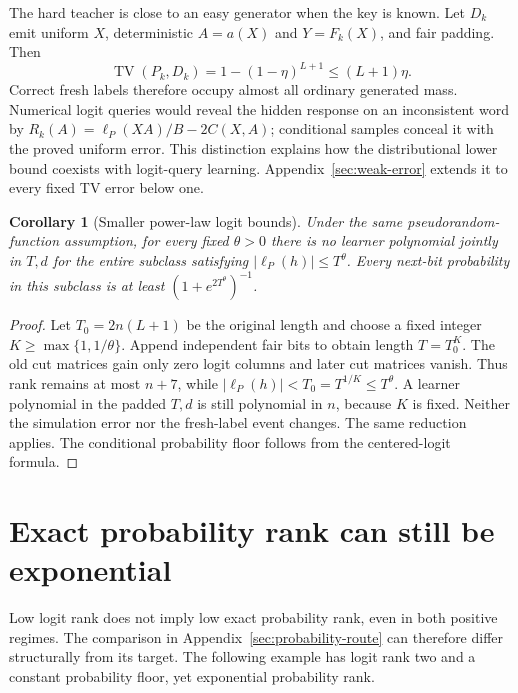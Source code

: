 \documentclass[11pt]{article}
\newcommand{\TV}{\operatorname{TV}}
\newtheorem{corollary}[theorem]{Corollary}
\theoremstyle{definition}
\theoremstyle{remark}
\begin{document}
The hard teacher is close to an easy generator when the key is known. Let $D_k$ emit uniform $X$, deterministic $A=a(X)$ and $Y=F_k(X)$, and fair padding. Then
\[
\TV(P_k,D_k)=1-(1-\eta)^{L+1}\le(L+1)\eta.
\]
Correct fresh labels therefore occupy almost all ordinary generated mass. Numerical logit queries would reveal the hidden response on an inconsistent word by $R_k(A)=\ell_P(XA)/B-2C(X,A)$; conditional samples conceal it with the proved uniform error. This distinction explains how the distributional lower bound coexists with logit-query learning. Appendix~\ref{sec:weak-error} extends it to every fixed TV error below one.

\begin{corollary}[Smaller power-law logit bounds]\label{cor:power-logits}
Under the same pseudorandom-function assumption, for every fixed $\theta>0$ there is no learner polynomial jointly in $T,d$ for the entire subclass satisfying $|\ell_P(h)|\le T^\theta$. Every next-bit probability in this subclass is at least $(1+e^{2T^\theta})^{-1}$.
\end{corollary}
\begin{proof}
Let $T_0=2n(L+1)$ be the original length and choose a fixed integer $K\ge\max\{1,1/\theta\}$. Append independent fair bits to obtain length $T=T_0^K$. The old cut matrices gain only zero logit columns and later cut matrices vanish. Thus rank remains at most $n+7$, while
$|\ell_P(h)|<T_0=T^{1/K}\le T^\theta$. A learner polynomial in the padded $T,d$ is still polynomial in $n$, because $K$ is fixed. Neither the simulation error nor the fresh-label event changes. The same reduction applies. The conditional probability floor follows from the centered-logit formula.
\end{proof}


\section{Exact probability rank can still be exponential}\label{sec:separation}

Low logit rank does not imply low exact probability rank, even in both positive regimes. The comparison in Appendix~\ref{sec:probability-route} can therefore differ structurally from its target. The following example has logit rank two and a constant probability floor, yet exponential probability rank.
\end{document}
